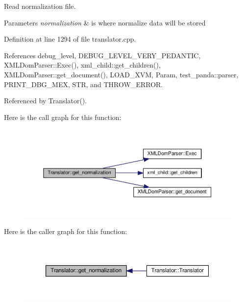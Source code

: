Read normalization file. 


\begin{DoxyParams}{Parameters}
{\em normalization} & is where normalize data will be stored \\
\hline
\end{DoxyParams}


Definition at line 1294 of file translator.\+cpp.



References debug\+\_\+level, D\+E\+B\+U\+G\+\_\+\+L\+E\+V\+E\+L\+\_\+\+V\+E\+R\+Y\+\_\+\+P\+E\+D\+A\+N\+T\+IC, X\+M\+L\+Dom\+Parser\+::\+Exec(), xml\+\_\+child\+::get\+\_\+children(), X\+M\+L\+Dom\+Parser\+::get\+\_\+document(), L\+O\+A\+D\+\_\+\+X\+VM, Param, test\+\_\+panda\+::parser, P\+R\+I\+N\+T\+\_\+\+D\+B\+G\+\_\+\+M\+EX, S\+TR, and T\+H\+R\+O\+W\+\_\+\+E\+R\+R\+OR.



Referenced by Translator().

Here is the call graph for this function\+:
\nopagebreak
\begin{figure}[H]
\begin{center}
\leavevmode
\includegraphics[width=350pt]{d4/dee/classTranslator_ab7c4afcf6779d0d8591e6b79a139e6ae_cgraph}
\end{center}
\end{figure}
Here is the caller graph for this function\+:
\nopagebreak
\begin{figure}[H]
\begin{center}
\leavevmode
\includegraphics[width=350pt]{d4/dee/classTranslator_ab7c4afcf6779d0d8591e6b79a139e6ae_icgraph}
\end{center}
\end{figure}
\mbox{\label{classTranslator_a409e3ad28e96a0dd3760dd934aa42a95}} 
